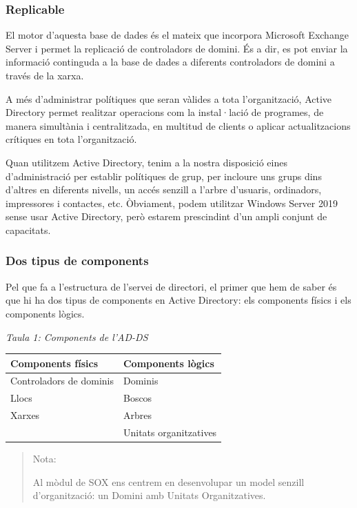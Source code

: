 \documentclass[
  a4paper,
]{article}
\begin{document}
\subsubsection{Replicable}\label{replicable}

El motor d'aquesta base de dades és el mateix que incorpora Microsoft
Exchange Server i permet la replicació de controladors de domini. És a
dir, es pot enviar la informació continguda a la base de dades a
diferents controladors de domini a través de la xarxa.

A més d'administrar polítiques que seran vàlides a tota l'organització,
Active Directory permet realitzar operacions com la instal·lació de
programes, de manera simultània i centralitzada, en multitud de clients
o aplicar actualitzacions crítiques en tota l'organització.

Quan utilitzem Active Directory, tenim a la nostra disposició eines
d'administració per establir polítiques de grup, per incloure uns grups
dins d'altres en diferents nivells, un accés senzill a l'arbre
d'usuaris, ordinadors, impressores i contactes, etc. Òbviament, podem
utilitzar Windows Server 2019 sense usar Active Directory, però estarem
prescindint d'un ampli conjunt de capacitats.

\subsubsection{Dos tipus de components}\label{dos-tipus-de-components}

Pel que fa a l'estructura de l'servei de directori, el primer que hem de
saber és que hi ha dos tipus de components en Active Directory: els
components físics i els components lògics.

\emph{Taula 1: Components de l'AD-DS}

\begin{longtable}[]{@{}ll@{}}
\toprule\noalign{}
Components físics & Components lògics \\
\midrule\noalign{}
\endhead
\bottomrule\noalign{}
\endlastfoot
Controladors de dominis & Dominis \\
Llocs & Boscos \\
Xarxes & Arbres \\
& Unitats organitzatives \\
\end{longtable}

\begin{quote}
Nota:

Al mòdul de SOX ens centrem en desenvolupar un model senzill
d'organització: un Domini amb Unitats Organitzatives.
\end{quote}
\end{document}
